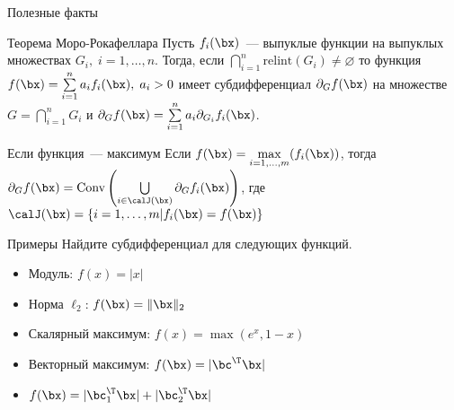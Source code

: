 \documentclass[12pt]{beamer}
\begin{document}
\begin{frame}{Полезные факты}
\begin{block}{Теорема Моро-Рокафеллара}
Пусть $f_i(\bx)$~--- выпуклые функции на выпуклых множествах $G_i, \; i = 1,\ldots,n$. 
Тогда, если $\bigcap\limits_{i=1}^n \text{relint} (G_i) \neq \varnothing$ то функция $f(\bx) = \sum\limits_{i=1}^n a_i f_i(\bx), \; a_i > 0$ имеет субдифференциал $\partial_G f(\bx)$ на множестве $G = \bigcap\limits_{i=1}^n G_i$ и $\partial_G f(\bx) = \sum\limits_{i=1}^n a_i \partial_{G_i} f_i(\bx)$. 
\end{block}

\begin{block}{Если функция~--- максимум}
Если $f(\bx) = \max\limits_{i=1,\ldots,m}(f_i(\bx))$, тогда 
\pause
$\partial_G f(\bx) = \text{Conv} \left(\bigcup\limits_{i \in \calJ(\bx)} \partial_G f_i(\bx)\right)$, где $\calJ(\bx) = \{ i = 1,\ldots, m | f_i(\bx) = f(\bx) \}$
\end{block}
\end{frame}

\begin{frame}{Примеры}
Найдите субдифференциал для следующих функций.
\begin{itemize}
\item Модуль: $f(x) = |x|$
\item Норма $\ell_2$: $f(\bx) = \| \bx \|_2$
\item Скалярный максимум: $f(x) = \max(e^x, 1 - x)$
\item Векторный максимум: $f(\bx) = |\bc^{\T}\bx|$
\item $f(\bx) = |\bc^{\T}_1\bx| + |\bc^{\T}_2\bx|$
\end{itemize}
\end{frame}
\end{document}
